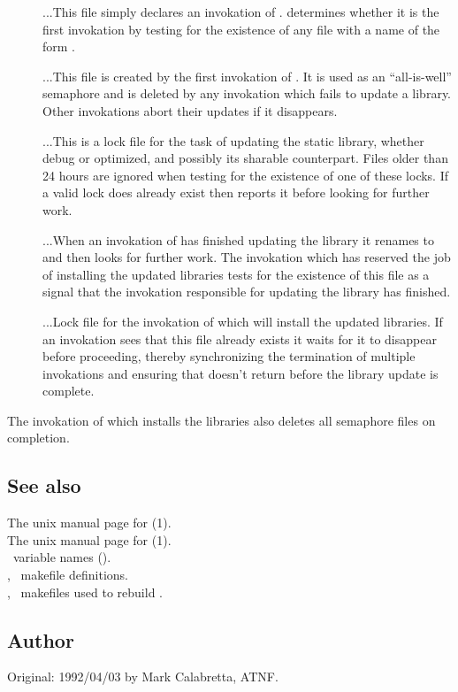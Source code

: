 \begin{description}
\item[]
...This file simply declares an invokation of .
 determines whether it is the first invokation by testing for
the existence of any file with a name of the form .

\item[]
...This file is created by the first invokation of .  It is
used as an ``all-is-well'' semaphore and is deleted by any invokation which
fails to update a library.  Other invokations abort their updates if it
disappears.

\item[]
...This is a lock file for the task of updating the static library, whether
debug or optimized, and possibly its sharable counterpart.  Files older than
24 hours are ignored when testing for the existence of one of these locks.  If
a valid lock does already exist then  reports it before looking
for further work.

\item[]
...When an invokation of  has finished updating the library it
renames  to  and then looks for
further work.  The invokation which has reserved the job of installing the
updated libraries tests for the existence of this file as a signal that the
invokation responsible for updating the library has finished.

\item[]
...Lock file for the invokation of  which will install the
updated libraries.  If an invokation sees that this file already exists it
waits for it to disappear before proceeding, thereby synchronizing the
termination of multiple invokations and ensuring that  doesn't
return before the library update is complete.
\end{description}

\noindent
The invokation of  which installs the libraries also deletes
all semaphore files on completion.

\subsection*{See also}

The unix manual page for (1).\\
The unix manual page for (1).\\
\aipspp\ variable names ().\\
, \aipspp\ makefile definitions.\\
, \gnu\ makefiles used to rebuild \aipspp.

\subsection*{Author}

Original: 1992/04/03 by Mark Calabretta, ATNF.
